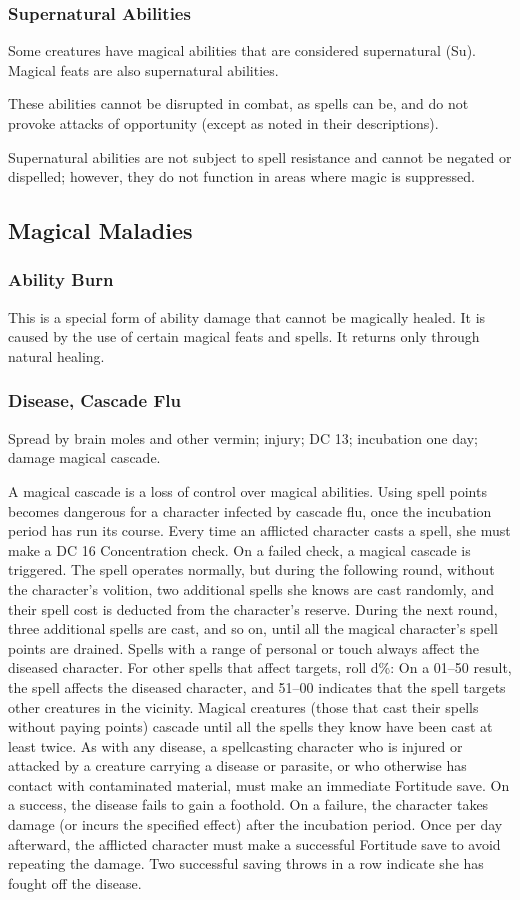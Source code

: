 \subsubsection{Supernatural Abilities}
Some creatures have magical abilities that are considered supernatural (Su). 
Magical feats are also supernatural abilities. 

These abilities cannot be disrupted in combat, as spells can be, 
and do not provoke attacks of opportunity (except as noted in their descriptions). 

Supernatural abilities are not subject to spell resistance and cannot be negated or dispelled; 
however, they do not function in areas where magic is suppressed.
\subsection{Magical Maladies}
\subsubsection{Ability Burn}
This is a special form of ability damage that cannot be magically healed. 
It is caused by the use of certain magical feats and spells. It returns only through natural healing.

\subsubsection{Disease, Cascade Flu}
Spread by brain moles and other vermin; injury; DC 13; incubation one day; damage magical cascade.

A magical cascade is a loss of control over magical abilities. Using spell points becomes dangerous for a character infected by cascade flu, 
once the incubation period has run its course. 
Every time an afflicted character casts a spell, she must make a DC 16 Concentration check. 
On a failed check, a magical cascade is triggered. 
The spell operates normally, but during the following round, without the character's volition, 
two additional spells she knows are cast randomly, and their spell cost is deducted from the character's reserve. 
During the next round, three additional spells are cast, and so on, until all the magical character's spell points are drained. 
Spells with a range of personal or touch always affect the diseased character. 
For other spells that affect targets, roll d\%: On a 01–50 result, the spell affects the diseased character, 
and 51–00 indicates that the spell targets other creatures in the vicinity. 
Magical creatures (those that cast their spells without paying points) cascade until all the spells they know have been cast at least twice.
As with any disease, a spellcasting character who is injured or attacked by a creature carrying a disease or parasite, 
or who otherwise has contact with contaminated material, must make an immediate Fortitude save. 
On a success, the disease fails to gain a foothold. 
On a failure, the character takes damage (or incurs the specified effect) after the incubation period. 
Once per day afterward, the afflicted character must make a successful Fortitude save to avoid repeating the damage. 
Two successful saving throws in a row indicate she has fought off the disease.
